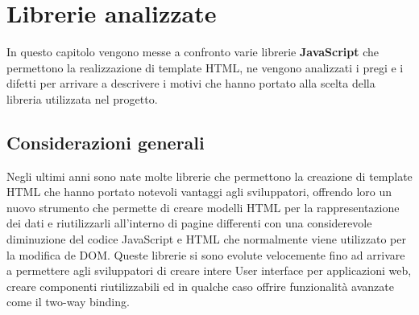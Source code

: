 
\chapter{Librerie analizzate}
\label{cap:librerie-analizzate}
In questo capitolo vengono messe a confronto varie librerie \textbf{JavaScript} che permettono la realizzazione di template HTML, ne vengono analizzati i pregi e i difetti per arrivare a descrivere i motivi che hanno portato alla scelta della libreria utilizzata nel progetto.

\section{Considerazioni generali}
Negli ultimi anni sono nate molte librerie che permettono la creazione di template HTML che hanno portato notevoli vantaggi agli sviluppatori, offrendo loro un nuovo strumento che permette di creare modelli HTML per la rappresentazione dei dati e riutilizzarli all'interno di pagine differenti con una considerevole diminuzione del codice JavaScript e HTML che normalmente viene utilizzato per la modifica de DOM.
Queste librerie si sono evolute velocemente fino ad arrivare a permettere agli sviluppatori di creare intere User interface per applicazioni web, creare componenti riutilizzabili ed in qualche caso offrire funzionalità avanzate come il two-way binding.

